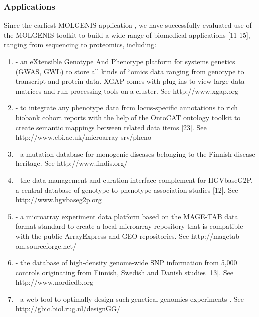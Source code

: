 \subsubsection{Applications}
Since the earliest MOLGENIS application \cite{Swertz:2004}, we have successfully evaluated use of the MOLGENIS 
toolkit to build a wide range of biomedical applications [11-15], ranging from sequencing to 
proteomics, including:

\begin{enumerate}\itemsep1pt
\item {} - an eXtensible Genotype And Phenotype platform \cite{Swertz:2010a} for systems genetics 
(GWAS, GWL) to store all kinds of *omics data ranging from genotype to transcript and protein 
data. XGAP comes with plug-ins to view large data matrices and run processing tools on a cluster. 
See http://www.xgap.org
\item {} - to integrate any phenotype data from locus-specific annotations to 
rich biobank cohort reports with the help of the OntoCAT ontology toolkit to create semantic 
mappings between related data items [23]. See http://www.ebi.ac.uk/microarray-srv/pheno
\item {} - a mutation database for monogenic diseases belonging to the Finnish 
disease heritage. See http://www.findis.org/
\item {} - the data management and curation interface complement for HGVbaseG2P, 
a central database of genotype to phenotype association studies [12]. See http://www.hgvbaseg2p.org
\item {} - a microarray experiment data platform based on the MAGE-TAB data format 
standard to create a local microarray repository that is compatible with the public ArrayExpress 
and GEO repositories. See http://magetab-om.sourceforge.net/ 
\item {} - the database of high-density genome-wide SNP information from 5,000 
controls originating from Finnish, Swedish and Danish studies [13]. See http://www.nordicdb.org
\item {} - a web tool to optimally design such genetical genomics experiments \cite{Li:2009}. 
See http://gbic.biol.rug.nl/designGG/
\end{enumerate}

